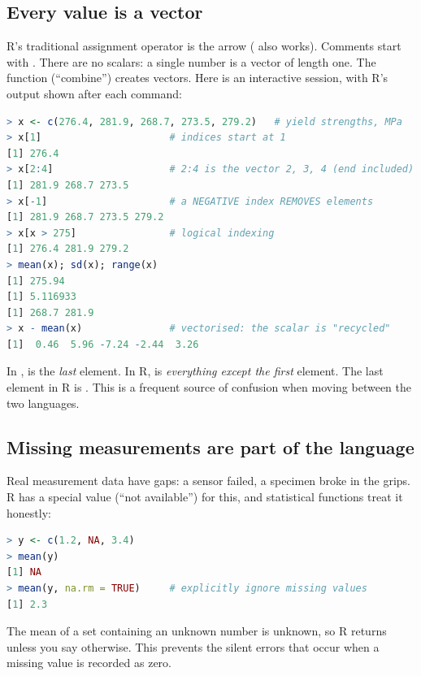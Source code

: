 \subsection*{Every value is a vector}

R's traditional assignment operator is the arrow \code{<-} (\code{=} also works). Comments
start with \code{\#}. There are no scalars: a single number is a vector of length one. The
function  (``combine'') creates vectors. Here is an interactive session, with
R's output shown after each command:
\begin{lstlisting}[language=R]
> x <- c(276.4, 281.9, 268.7, 273.5, 279.2)   # yield strengths, MPa
> x[1]                      # indices start at 1
[1] 276.4
> x[2:4]                    # 2:4 is the vector 2, 3, 4 (end included)
[1] 281.9 268.7 273.5
> x[-1]                     # a NEGATIVE index REMOVES elements
[1] 281.9 268.7 273.5 279.2
> x[x > 275]                # logical indexing
[1] 276.4 281.9 279.2
> mean(x); sd(x); range(x)
[1] 275.94
[1] 5.116933
[1] 268.7 281.9
> x - mean(x)               # vectorised: the scalar is "recycled"
[1]  0.46  5.96 -7.24 -2.44  3.26
\end{lstlisting}

\begin{pitfall}
In \py,  is the \emph{last} element. In R,  is \emph{everything
except the first} element. The last element in R is . This is a
frequent source of confusion when moving between the two languages.
\end{pitfall}

\subsection*{Missing measurements are part of the language}

Real measurement data have gaps: a sensor failed, a specimen broke in the grips. R has a
special value  (``not available'') for this, and statistical functions treat it
honestly:
\begin{lstlisting}[language=R]
> y <- c(1.2, NA, 3.4)
> mean(y)
[1] NA
> mean(y, na.rm = TRUE)     # explicitly ignore missing values
[1] 2.3
\end{lstlisting}
The mean of a set containing an unknown number is unknown, so R returns  unless
you say otherwise. This prevents the silent errors that occur when a missing value is
recorded as zero.

